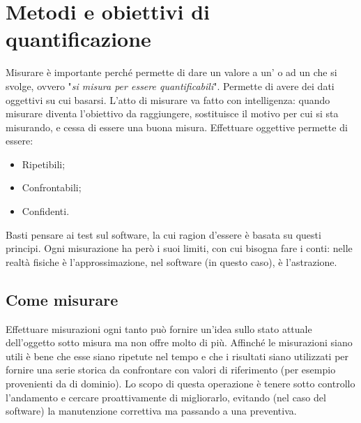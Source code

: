 \documentclass[../main]{subfiles}
\begin{document}
\section{Metodi e obiettivi di quantificazione}
Misurare è importante perché permette di dare un valore a un' o ad un  che si svolge, ovvero "\textit{si misura per essere quantificabili}". Permette di avere dei dati oggettivi su cui basarsi.\newline
L'atto di misurare va fatto con intelligenza: quando misurare diventa l'obiettivo da raggiungere, sostituisce il motivo per cui si sta misurando, e cessa di essere una buona misura.\newline
Effettuare  oggettive permette di essere:
\begin{itemize}
    \item Ripetibili;
    \item Confrontabili;
    \item Confidenti.
\end{itemize}
Basti pensare ai test sul software, la cui ragion d'essere è basata su questi principi. Ogni misurazione ha però i suoi limiti, con cui bisogna fare i conti: nelle realtà fisiche è l'approssimazione, nel software (in questo caso), è l'astrazione.
\subsection{Come misurare}
Effettuare misurazioni ogni tanto può fornire un'idea sullo stato attuale dell'oggetto sotto misura ma non offre molto di più. Affinché le misurazioni siano utili è bene che esse siano ripetute nel tempo e che i risultati siano utilizzati per fornire una serie storica da confrontare con valori di riferimento (per esempio provenienti da  di dominio). Lo scopo di questa operazione è tenere sotto controllo l'andamento e cercare proattivamente di migliorarlo, evitando (nel caso del software) la manutenzione correttiva ma passando a una preventiva.
\end{document}
